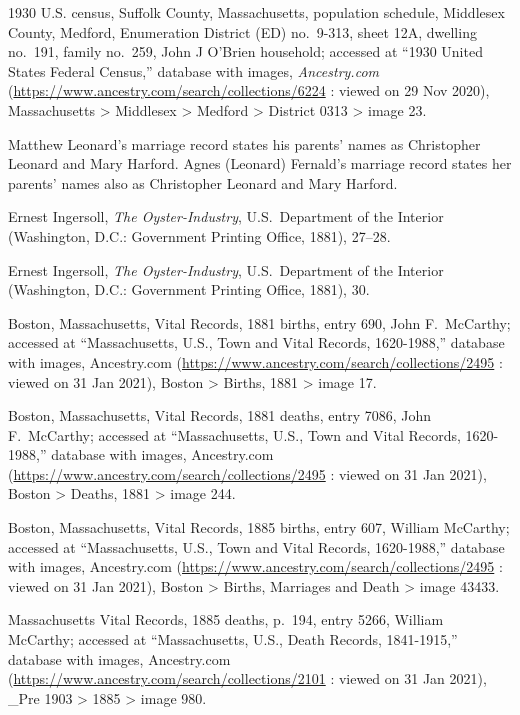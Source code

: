 \begin{thebibliography}{999}
	1930 U.S. census, Suffolk County, Massachusetts, population schedule, Middlesex County, Medford, Enumeration District (ED) no.\ 9-313, sheet 12A, dwelling no.\ 191, family no.\ 259, John J O'Brien household; accessed at ``1930 United States Federal Census,'' database with images, \textit{Ancestry.com} (\url{https://www.ancestry.com/search/collections/6224} : viewed on 29 Nov 2020), Massachusetts > Middlesex > Medford > District 0313 > image 23.
	
	Matthew Leonard's marriage record states his parents' names as Christopher Leonard and Mary Harford. Agnes (Leonard) Fernald's marriage record states her parents' names also as Christopher Leonard and Mary Harford.
	
	Ernest Ingersoll, \textit{The Oyster-Industry}, U.S.\ Department of the Interior (Washington, D.C.: Government Printing Office, 1881), 27--28.
	
	Ernest Ingersoll, \textit{The Oyster-Industry}, U.S.\ Department of the Interior (Washington, D.C.: Government Printing Office, 1881), 30.
	
	Boston, Massachusetts, Vital Records, 1881 births, entry 690, John F.\ McCarthy; accessed at ``Massachusetts, U.S., Town and Vital Records, 1620-1988,'' database with images, Ancestry.com (\url{https://www.ancestry.com/search/collections/2495} : viewed on 31 Jan 2021), Boston > Births, 1881 > image 17.
	
	Boston, Massachusetts, Vital Records, 1881 deaths, entry 7086, John F.\ McCarthy; accessed at ``Massachusetts, U.S., Town and Vital Records, 1620-1988,'' database with images, Ancestry.com (\url{https://www.ancestry.com/search/collections/2495} : viewed on 31 Jan 2021), Boston > Deaths, 1881 > image 244.
	
	Boston, Massachusetts, Vital Records, 1885 births, entry 607, William McCarthy; accessed at ``Massachusetts, U.S., Town and Vital Records, 1620-1988,'' database with images, Ancestry.com (\url{https://www.ancestry.com/search/collections/2495} : viewed on 31 Jan 2021), Boston > Births, Marriages and Death > image 43433.
	
	Massachusetts Vital Records, 1885 deaths, p.\ 194, entry 5266, William McCarthy; accessed at ``Massachusetts, U.S., Death Records, 1841-1915,'' database with images, Ancestry.com (\url{https://www.ancestry.com/search/collections/2101} : viewed on 31 Jan 2021), \_Pre 1903 > 1885 > image 980.
	
\end{thebibliography}